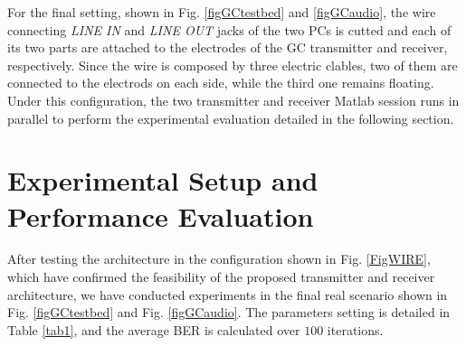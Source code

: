 For the final setting, shown in
Fig.  \ref{figGCtestbed} and \ref{figGCaudio},
the wire connecting \emph{LINE IN} and \emph{LINE OUT} jacks of the two PCs is cutted and each of its two parts are attached to the electrodes of the GC transmitter and receiver, respectively. Since the wire is composed by three electric clables, two of them are connected to the electrods on each side, while the third one remains floating. Under this configuration, the two transmitter and receiver Matlab session runs in parallel to perform the experimental evaluation detailed in the following section.




\section{Experimental Setup and Performance Evaluation}
\label{Exp}

After testing the architecture in the configuration shown in Fig. \ref{FigWIRE}, which have confirmed the feasibility of the proposed transmitter and receiver architecture, we have conducted experiments in the final real scenario shown in Fig. \ref{figGCtestbed} and Fig. \ref{figGCaudio}. 
The parameters setting is detailed in Table \ref{tab1}, and the average BER is calculated over $100$ iterations. 


